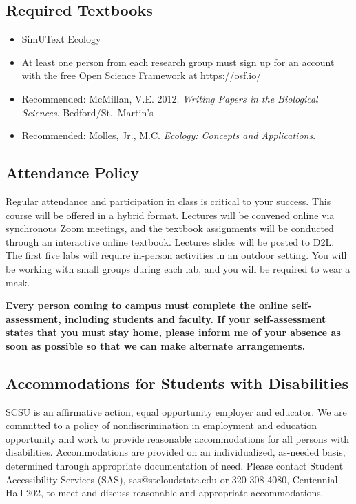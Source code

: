 \documentclass{tufte-handout}
\begin{document}
\begin{fullwidth}
\subsection{Required Textbooks}

\begin{itemize}
	\item SimUText Ecology
	\item At least one person from each research group must sign up for an account with the free Open Science Framework at https://osf.io/
	\item Recommended: McMillan, V.E. 2012. \emph{Writing Papers in the Biological Sciences}. Bedford/St.\ Martin's
	\item Recommended: Molles, Jr., M.C. \emph{Ecology: Concepts and Applications}.
\end{itemize}

\subsection{Attendance Policy}

Regular attendance and participation in class is critical to your success. This course will be offered in a hybrid format. Lectures will be convened online via synchronous Zoom meetings, and the textbook assignments will be conducted through an interactive online textbook. Lectures slides will be posted to D2L. The first five labs will require in-person activities in an outdoor setting. You will be working with small groups during each lab, and you will be required to wear a mask. 

\textbf{Every person coming to campus must complete the online self-assessment, including students and faculty. If your self-assessment states that you must stay home, please inform me of your absence as soon as possible so that we can make alternate arrangements.}



\subsection{Accommodations for Students with Disabilities}

SCSU is an affirmative action, equal opportunity employer and educator. We are committed to a policy of nondiscrimination in employment and education opportunity and work to provide reasonable accommodations for all persons with disabilities. Accommodations are provided on an individualized, as-needed basis, determined through appropriate documentation of need. Please contact Student Accessibility Services (SAS), sas@stcloudstate.edu or 320-308-4080, Centennial Hall 202, to meet and discuss reasonable and appropriate accommodations. 


\end{fullwidth}
\end{document}
